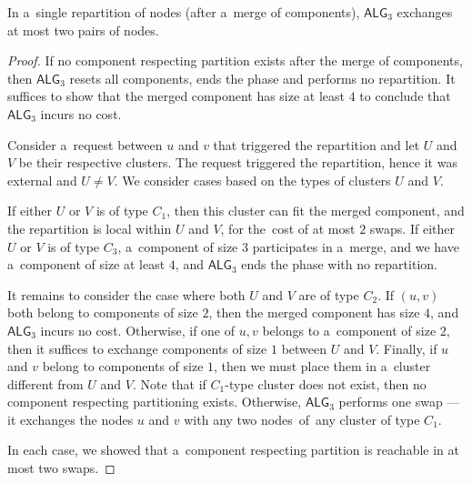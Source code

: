 \documentclass[a4paper,anonymous,USenglish]{lipics-v2019}
\newcommand{\TAlg}{{\ensuremath{\textsf{ALG}_{3}}}\xspace}
\begin{document}
\begin{lemma}
	\label{lem:1req}
	In a~single repartition of nodes (after a~merge of components), \TAlg exchanges at most two pairs of nodes.
\end{lemma}

\begin{proof}
	If no component respecting partition exists after the merge of components, then \TAlg resets all components, ends the phase and performs no repartition.
	It suffices to show that the merged component has size at least $4$ to conclude that \TAlg incurs no cost.
	
	
	Consider a~request between $u$ and $v$ that triggered the repartition and let $U$ and $V$ be their respective clusters.
	The request triggered the repartition, hence it was external and $U\neq V$.
	We consider cases based on the types of clusters $U$ and $V$.
	
	If either $U$ or $V$ is of type $C_1$, then this cluster can fit the merged component, and the repartition is local within $U$ and $V$, for the~cost of at most $2$ swaps.
	If either $U$ or $V$ is of type $C_3$, a~component of size $3$ participates in a~merge, and we have a~component of size at least $4$, and \TAlg ends the phase with no repartition.
	
	
	It remains to consider the case where both $U$ and $V$ are of type $C_2$.
	If $(u,v)$ both belong to components of size $2$, then the merged component has size $4$, and \TAlg incurs no cost. 
	Otherwise, if one of $u,v$ belongs to a~component of size $2$, then it suffices to exchange components of size $1$ between $U$ and $V$.
	Finally, if $u$ and $v$ belong to components of size $1$, then we must place them in a~cluster different from $U$ and $V$.
	Note that if $C_1$-type cluster does not exist, then no component respecting partitioning exists.
	Otherwise, \TAlg performs one swap --- it exchanges the nodes $u$ and $v$ with any two nodes~of~any cluster of type $C_1$.

	In each case, we showed that a~component respecting partition is reachable in at most two swaps.
\end{proof}
\end{document}
